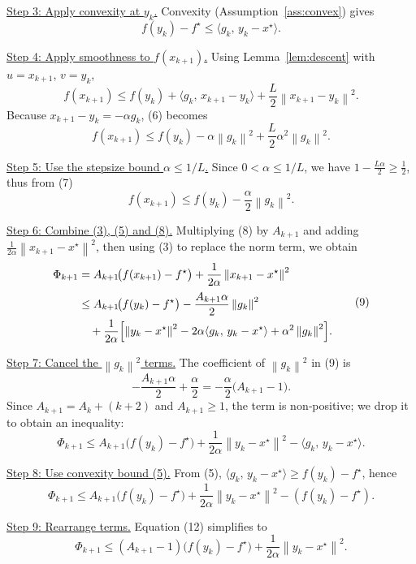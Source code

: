 \documentclass{article}
\newcommand{\norm}[1]{\left\|#1\right\|}
\begin{document}
\noindent\underline{Step 3: Apply convexity at $y_k$.}  
Convexity (Assumption~\ref{ass:convex}) gives
\[
f(y_k)-f^\star \le \langle g_k,\,y_k-x^\star\rangle .
\tag{5}
\]

\noindent\underline{Step 4: Apply smoothness to $f(x_{k+1})$.}  
Using Lemma~\ref{lem:descent} with $u=x_{k+1}$, $v=y_k$,
\[
f(x_{k+1}) \le f(y_k)+\langle g_k,\,x_{k+1}-y_k\rangle
               +\frac{L}{2}\norm{x_{k+1}-y_k}^2 .
\tag{6}
\]
Because $x_{k+1}-y_k=-\alpha g_k$, (6) becomes
\[
f(x_{k+1}) \le f(y_k)-\alpha\norm{g_k}^2
               +\frac{L}{2}\alpha^2\norm{g_k}^2 .
\tag{7}
\]

\noindent\underline{Step 5: Use the stepsize bound $\alpha\le 1/L$.}  
Since $0<\alpha\le 1/L$, we have $1-\frac{L\alpha}{2}\ge \frac{1}{2}$, thus from (7)
\[
f(x_{k+1}) \le f(y_k)-\frac{\alpha}{2}\norm{g_k}^2 .
\tag{8}
\]

\noindent\underline{Step 6: Combine (3), (5) and (8).}  
Multiplying (8) by $A_{k+1}$ and adding $\frac{1}{2\alpha}\norm{x_{k+1}-x^\star}^2$,
then using (3) to replace the norm term, we obtain
\[
\begin{aligned}
\Phi_{k+1}
&= A_{k+1}\!\bigl(f(x_{k+1})-f^\star\bigr)
   +\frac{1}{2\alpha}\norm{x_{k+1}-x^\star}^2\\[2pt]
&\le A_{k+1}\!\bigl(f(y_k)-f^\star\bigr)
   -\frac{A_{k+1}\alpha}{2}\norm{g_k}^2\\
&\quad+\frac{1}{2\alpha}\Bigl[\norm{y_k-x^\star}^2
      -2\alpha\langle g_k,\,y_k-x^\star\rangle
      +\alpha^2\norm{g_k}^2\Bigr] .
\end{aligned}
\tag{9}
\]

\noindent\underline{Step 7: Cancel the $\norm{g_k}^2$ terms.}  
The coefficient of $\norm{g_k}^2$ in (9) is
\[
-\frac{A_{k+1}\alpha}{2}+\frac{\alpha}{2}= -\frac{\alpha}{2}\bigl(A_{k+1}-1\bigr).
\tag{10}
\]
Since $A_{k+1}=A_k+\! (k+2)$ and $A_{k+1}\ge 1$, the term is non‑positive; we drop it to obtain an inequality:
\[
\Phi_{k+1}\le A_{k+1}\!\bigl(f(y_k)-f^\star\bigr)
           +\frac{1}{2\alpha}\norm{y_k-x^\star}^2
           -\langle g_k,\,y_k-x^\star\rangle .
\tag{11}
\]

\noindent\underline{Step 8: Use convexity bound (5).}  
From (5), $\langle g_k,\,y_k-x^\star\rangle \ge f(y_k)-f^\star$, hence
\[
\Phi_{k+1}\le A_{k+1}\!\bigl(f(y_k)-f^\star\bigr)
           +\frac{1}{2\alpha}\norm{y_k-x^\star}^2
           -(f(y_k)-f^\star) .
\tag{12}
\]

\noindent\underline{Step 9: Rearrange terms.}  
Equation (12) simplifies to
\[
\Phi_{k+1}\le (A_{k+1}-1)\!\bigl(f(y_k)-f^\star\bigr)
           +\frac{1}{2\alpha}\norm{y_k-x^\star}^2 .
\tag{13}
\]
\end{document}
